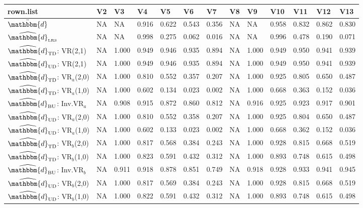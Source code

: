 \begin{table}[ht]
\centering
\begin{tabular}{lllllllllllll}
  \hline
rown.list & V2 & V3 & V4 & V5 & V6 & V7 & V8 & V9 & V10 & V11 & V12 & V13 \\ 
  \hline
$\ddot{\mathbbm{d}}$ &    NA  &    NA  &  0.916  &  0.622  &  0.543  &  0.356  &    NA  &    NA  &  0.958  &  0.832  &  0.862  &  0.830  \\ 
  $\widehat{\mathbbm{d}}_{\text{\tiny{LRS}}}$ &    NA  &    NA  &  0.998  &  0.275  &  0.062  &  0.016  &    NA  &    NA  &  0.996  &  0.478  &  0.190  &  0.071  \\ 
  $\widehat{\mathbbm{d}}_{\rm TD}$: VR(2,1)  &    NA  &  1.000  &  0.949  &  0.946  &  0.935  &  0.894  &    NA  &  1.000  &  0.949  &  0.950  &  0.941  &  0.939  \\ 
  $\widehat{\mathbbm{d}}_{\rm UD}$: VR(2,1)  &    NA  &  1.000  &  0.949  &  0.946  &  0.935  &  0.894  &    NA  &  1.000  &  0.949  &  0.950  &  0.941  &  0.939  \\ 
  $\widehat{\mathbbm{d}}_{\rm TD}$: VR$_a$(2,0)  &    NA  &  1.000  &  0.810  &  0.552  &  0.357  &  0.207  &    NA  &  1.000  &  0.925  &  0.805  &  0.650  &  0.487  \\ 
  $\widehat{\mathbbm{d}}_{\rm TD}$: VR$_a$(1,0)  &    NA  &  1.000  &  0.602  &  0.134  &  0.023  &  0.002  &    NA  &  1.000  &  0.668  &  0.363  &  0.152  &  0.036  \\ 
  $\widehat{\mathbbm{d}}_{\rm BU}$: Inv.VR$_a$ &    NA  &  0.908  &  0.915  &  0.872  &  0.860  &  0.812  &    NA  &  0.916  &  0.925  &  0.923  &  0.917  &  0.901  \\ 
  $\widehat{\mathbbm{d}}_{\rm UD}$: VR$_a$(2,0)  &    NA  &  1.000  &  0.810  &  0.552  &  0.358  &  0.207  &    NA  &  1.000  &  0.925  &  0.804  &  0.650  &  0.487  \\ 
  $\widehat{\mathbbm{d}}_{\rm UD}$: VR$_a$(1,0)  &    NA  &  1.000  &  0.602  &  0.133  &  0.023  &  0.002  &    NA  &  1.000  &  0.668  &  0.362  &  0.152  &  0.036  \\ 
  $\widehat{\mathbbm{d}}_{\rm TD}$: VR$_b$(2,0)  &    NA  &  1.000  &  0.817  &  0.568  &  0.384  &  0.243  &    NA  &  1.000  &  0.928  &  0.815  &  0.668  &  0.519  \\ 
  $\widehat{\mathbbm{d}}_{\rm TD}$: VR$_b$(1,0)  &    NA  &  1.000  &  0.823  &  0.591  &  0.432  &  0.312  &    NA  &  1.000  &  0.893  &  0.748  &  0.615  &  0.498  \\ 
  $\widehat{\mathbbm{d}}_{\rm BU}$: Inv.VR$_b$  &    NA  &  0.911  &  0.918  &  0.878  &  0.851  &  0.749  &    NA  &  0.918  &  0.928  &  0.933  &  0.941  &  0.945  \\ 
  $\widehat{\mathbbm{d}}_{\rm UD}$: VR$_b$(2,0)  &    NA  &  1.000  &  0.817  &  0.569  &  0.384  &  0.243  &    NA  &  1.000  &  0.928  &  0.815  &  0.668  &  0.519  \\ 
  $\widehat{\mathbbm{d}}_{\rm UD}$: VR$_b$(1,0)  &    NA  &  1.000  &  0.822  &  0.591  &  0.432  &  0.312  &    NA  &  1.000  &  0.893  &  0.748  &  0.615  &  0.498  \\ 
   \hline
\end{tabular}
\end{table}
